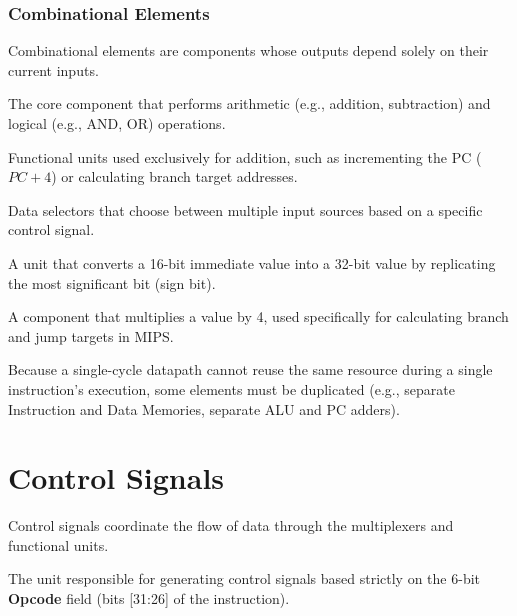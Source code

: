 \subsubsection{Combinational Elements}
Combinational elements are components whose outputs depend solely on their current inputs.

\begin{vocabulary}
The core component that performs arithmetic (e.g., addition, subtraction) and logical (e.g., AND, OR) operations.
\end{vocabulary}
\vspace{-10pt}
\begin{vocabulary}[Adders]
Functional units used exclusively for addition, such as incrementing the PC ($PC + 4$) or calculating branch target addresses.
\end{vocabulary}
\vspace{-10pt}
\begin{vocabulary}
Data selectors that choose between multiple input sources based on a specific control signal.
\end{vocabulary}
\vspace{-10pt}
\begin{vocabulary}
A unit that converts a 16-bit immediate value into a 32-bit value by replicating the most significant bit (sign bit).
\end{vocabulary}
\vspace{-10pt}
\begin{vocabulary}
A component that multiplies a value by 4, used specifically for calculating branch and jump targets in MIPS.
\end{vocabulary}

\begin{remark}
Because a single-cycle datapath cannot reuse the same resource during a single instruction's execution, some elements must be duplicated (e.g., separate Instruction and Data Memories, separate ALU and PC adders).
\end{remark}

\section{Control Signals}

Control signals coordinate the flow of data through the multiplexers and functional units.

\begin{definition}
The unit responsible for generating control signals based strictly on the 6-bit \textbf{Opcode} field (bits [31:26] of the instruction).
\end{definition}

